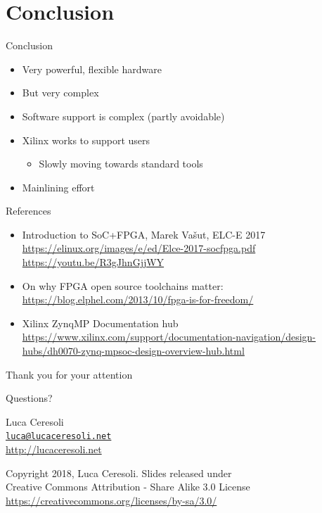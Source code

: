 \documentclass[xetex,table]{beamer}
\begin{document}
\section{Conclusion}

\begin{frame}{Conclusion}
  \begin{itemize}
  \item Very powerful, flexible hardware
  \item But very complex
  \item Software support is complex (partly avoidable)
  \item Xilinx works to support users
    \begin{itemize}
    \item Slowly moving towards standard tools
    \end{itemize}
  \item Mainlining effort
  \end{itemize}
\end{frame}

\begin{frame}{References}
  \begin{itemize}
  \item Introduction to SoC+FPGA, Marek Vašut, ELC-E 2017\\
    {\footnotesize\url{https://elinux.org/images/e/ed/Elce-2017-socfpga.pdf}}\\
    {\footnotesize\url{https://youtu.be/R3gJhnGjjWY}}
  \item On why FPGA open source toolchains matter:
    {\footnotesize\url{https://blog.elphel.com/2013/10/fpga-is-for-freedom/}}
  \item Xilinx ZynqMP Documentation hub\\
    {\tiny\url{https://www.xilinx.com/support/documentation-navigation/design-hubs/dh0070-zynq-mpsoc-design-overview-hub.html}}
  \end{itemize}
\end{frame}

\begin{frame}
  \begin{center}
    Thank you for your attention

    \vspace{0.15\textheight}

    {\Huge Questions?}

    \vspace{0.15\textheight}

    {\Large Luca Ceresoli}\\
    \href{mailto:luca@lucaceresoli.net}{\tt luca@lucaceresoli.net}\\
    \url{http://lucaceresoli.net}

    \vspace{0.05\textheight}

    \tiny
    \textcopyright{} Copyright 2018, Luca Ceresoli.
    Slides released under\\
    Creative Commons Attribution - Share Alike 3.0 License \\
    \url{https://creativecommons.org/licenses/by-sa/3.0/} \\
  \end{center}
\end{frame}
\end{document}
